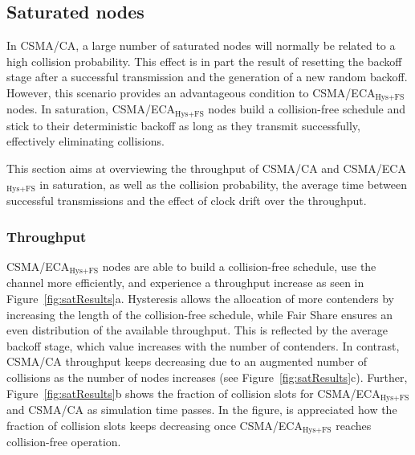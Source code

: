 
	\subsection{Saturated nodes}\label{resultsSaturated}
	In CSMA/CA, a large number of saturated nodes will normally be related to a high collision probability. This effect is in part the result of resetting the backoff stage after a successful transmission and the generation of a new random backoff. However, this scenario provides an advantageous condition to CSMA/ECA$_{\text{Hys+FS}}$ nodes. In saturation, CSMA/ECA$_{\text{Hys+FS}}$ nodes build a collision-free schedule and stick to their deterministic backoff as long as they transmit successfully, effectively eliminating collisions.
	
	This section aims at overviewing the throughput of CSMA/CA and CSMA/ECA$_{\text{Hys+FS}}$ in saturation, as well as the collision probability, the average time between successful transmissions and the effect of clock drift over the throughput.
	\\
	\subsubsection{Throughput}
	CSMA/ECA$_{\text{Hys+FS}}$ nodes are able to build a collision-free schedule, use the channel more efficiently, and experience a throughput increase as seen in Figure~\ref{fig:satResults}a. Hysteresis allows the allocation of more contenders by increasing the length of the collision-free schedule, while Fair Share ensures an even distribution of the available throughput. This is reflected by the average backoff stage, which value increases with the number of contenders. In contrast, CSMA/CA throughput keeps decreasing due to an augmented number of collisions as the number of nodes increases (see Figure~\ref{fig:satResults}c). Further, Figure~\ref{fig:satResults}b shows the fraction of collision slots for CSMA/ECA$_{\text{Hys+FS}}$ and CSMA/CA as simulation time passes. In the figure, is appreciated how the fraction of collision slots keeps decreasing once CSMA/ECA$_{\text{Hys+FS}}$ reaches collision-free operation.


